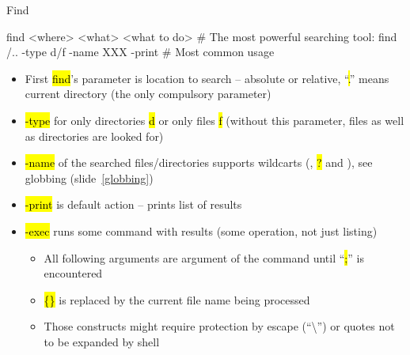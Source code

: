\documentclass[compress, ucs, xelatex, 11pt, xcolor=svgnames,
  hyperref={
    bookmarks=true,
    unicode=true,
    colorlinks=true,
    pdftitle={Linux, command line and MetaCentrum},
    plainpages=false,
    pdfauthor={Vojtech Zeisek},
    pdfsubject={Course about use of Linux command line, writing shell scripts and using MetaCentrum of CESNET},
    pdfcreator={XeLaTeX},
    pdfkeywords={Linux, GNU, BASH, shell, command line, MetaCentrum},
    linkcolor=DarkRed,
    anchorcolor=DarkBlue,
    citecolor=Indigo,
    filecolor=NavyBlue,
    menucolor=DarkMagenta,
    urlcolor=DarkBlue,
    pdftex},
  url={hyphens, lowtilde} %
  ]{beamer}
\renewcommand{\texttt}[1]{\hl{\ttfamily #1}}
\begin{document}
\begin{frame}[fragile]{Find}
  \begin{bashcode}
    find <where> <what> <what to do> # The most powerful searching tool:
    find /.. -type d/f -name XXX -print # Most common usage
  \end{bashcode}
  \begin{itemize}
    \item First \texttt{find}'s parameter is location to search -- absolute or relative, ``\texttt{.}'' means current directory (the only compulsory parameter)
    \item \texttt{-type} for only directories \texttt{d} or only files \texttt{f} (without this parameter, files as well as directories are looked for)
    \item \texttt{-name} of the searched files/directories supports wildcarts (\texttt{*}, \texttt{?} and \texttt{[\ldots]}), see globbing (slide~\ref{globbing})
    \item \texttt{-print} is default action -- prints list of results
    \item \texttt{-exec} runs some command with results (some operation, not just listing)
    \begin{itemize}
      \item All following arguments are argument of the command until ``\texttt{;}'' is encountered
      \item \texttt{\{\}} is replaced by the current file name being processed
      \item Those constructs might require protection by escape (``\textbackslash'') or quotes not to be expanded by shell
    \end{itemize}
  \end{itemize}
\end{frame}
\end{document}
